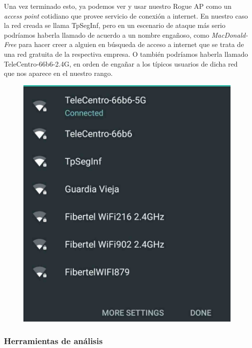 \documentclass[10pt,a4paper]{article}
\begin{document}
Una vez terminado esto, ya podemos ver y usar nuestro Rogue AP como un \textit{access point} cotidiano que provee servicio de conexión a internet. En nuestro caso la red creada se llama TpSegInf, pero en un escenario de ataque más serio podríamos haberla llamado de acuerdo a un nombre engañoso, como \textit{MacDonald-Free} para hacer creer a alguien en búsqueda de acceso a internet que se trata de una red gratuita de la respectiva empresa. O también podríamos haberla llamado TeleCentro-66b6-2.4G, en orden de engañar a los típicos usuarios de dicha red que nos aparece en el nuestro rango.

\begin{figure}[H]
\centerline{\includegraphics[scale=0.2]{images/rougeap.jpg}}
\caption{}
\end{figure}

\subsubsection{Herramientas de análisis}
\end{document}
